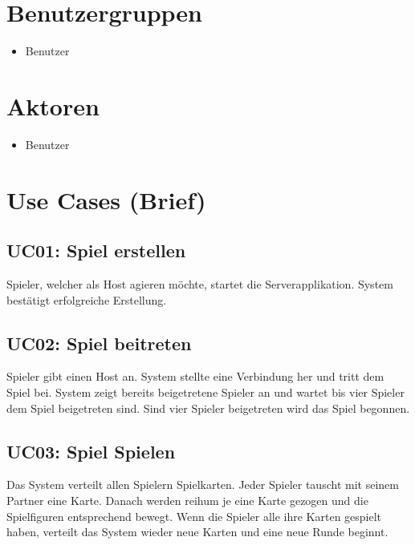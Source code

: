 \documentclass[a4paper,12pt,halfparskip,DIV14]{scrreprt}
\begin{document}
\section{Benutzergruppen}\label{sec:benutzergruppen} %
\begin{itemize}
	\item Benutzer
\end{itemize}

\section{Aktoren}\label{sec:aktoren} %
\begin{itemize}
	\item Benutzer
\end{itemize}

\section{Use Cases (Brief)}\label{sec:use_cases_brief_} %
\subsection{UC01: Spiel erstellen}\label{sub:uc01_spiel_erstellen} %
Spieler, welcher als Host agieren möchte, startet die Serverapplikation. System bestätigt erfolgreiche Erstellung.

\subsection{UC02: Spiel beitreten}\label{sub:uc02_spiel_beitreten} %
Spieler gibt einen Host an. System stellte eine Verbindung her und tritt dem Spiel bei. System zeigt bereits beigetretene Spieler an und wartet bis vier Spieler dem Spiel beigetreten sind. Sind vier Spieler beigetreten wird das Spiel begonnen.

\subsection{UC03: Spiel Spielen}\label{sub:uc03_spiel_spielen} %
Das System verteilt allen Spielern Spielkarten. Jeder Spieler tauscht mit seinem Partner eine Karte. Danach werden reihum je eine Karte gezogen und die Spielfiguren entsprechend bewegt. Wenn die Spieler alle ihre Karten gespielt haben, verteilt das System wieder neue Karten und eine neue Runde beginnt. 
\end{document}
